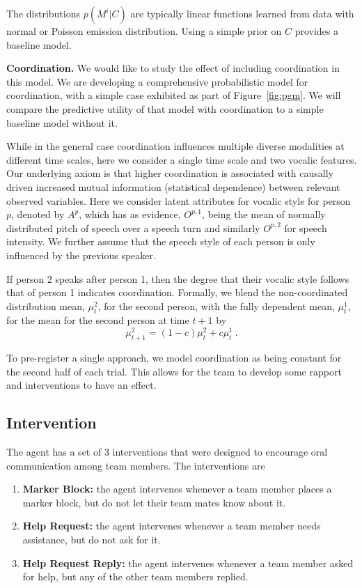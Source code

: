 %
    The distributions $p(M^i|C)$ are typically linear functions learned from data
    with normal or Poisson emission distribution. Using a simple prior on $C$
    provides a baseline model.

    \textbf{Coordination.}
    We would like to study the effect of including coordination in this model.
    We are developing a comprehensive probabilistic model for coordination, with
    a simple case exhibited as part of Figure~\ref{fig:pgm}.  We will compare
    the predictive utility of that model with coordination to a simple baseline
    model without it.

    While in the general case coordination influences multiple diverse
    modalities at different time scales, here we consider a single time scale
    and two vocalic features.  Our underlying axiom is that higher coordination
    is associated with causally driven increased mutual information (statistical
    dependence) between relevant observed variables. Here we consider latent
    attributes for vocalic style for person $p$, denoted by $A^{p}$, which has
    as evidence, $O^{p,1}$, being the mean of normally distributed pitch of
    speech over a speech turn and similarly $O^{p,2}$ for speech intensity.  We
    further assume that the speech style of each person is only influenced by
    the previous speaker.

    If person 2 speaks after person 1, then the degree that their vocalic style
    follows that of person 1 indicates coordination. Formally, we blend the
    non-coordinated distribution mean, $\mu^2_t$, for the second person, with
    the fully dependent mean, $\mu^1_t$, for the mean for the second person at
    time $t+1$ by
    \begin{equation}
    \mu^2_{t+1} = (1-c) \mu^2_t + c\mu^1_t ~.
    \end{equation}

    To pre-register a single approach, we model coordination as being constant
    for the second half of each trial. This allows for the team to develop some
    rapport and interventions to have an effect. 

\subsection{Intervention}

The agent has a set of 3 interventions that were designed to encourage oral communication among team members. The interventions are

\begin{enumerate}
	\item \textbf{Marker Block:} the agent intervenes whenever a team member places a marker block, but do not let their team mates know about it.
	\item \textbf{Help Request:} the agent intervenes whenever a team member needs assistance, but do not ask for it.
	\item \textbf{Help Request Reply:} the agent intervenes whenever a team member asked for help, but any of the other team members replied.
\end{enumerate}

